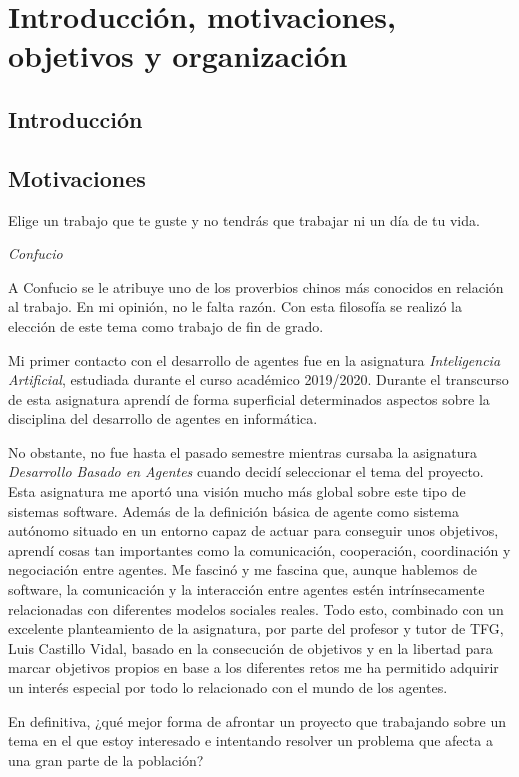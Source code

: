 \chapter{Introducción, motivaciones, objetivos y organización}
    \label{chap:one}

\section{Introducción}

\section{Motivaciones}
\epigraph{Elige un trabajo que te guste y no tendrás que trabajar ni un día de tu vida.}{\textit{Confucio}}

A Confucio se le atribuye uno de los proverbios chinos más conocidos en relación al trabajo. En mi opinión, no le falta razón. Con esta filosofía se realizó la elección de este tema como trabajo de fin de grado.

Mi primer contacto con el desarrollo de agentes fue en la asignatura \textit{Inteligencia Artificial}, estudiada durante el curso académico 2019/2020. Durante el transcurso de esta asignatura aprendí de forma superficial determinados aspectos sobre la disciplina del desarrollo de agentes en informática.

No obstante, no fue hasta el pasado semestre mientras cursaba la asignatura \textit{Desarrollo Basado en Agentes} cuando decidí seleccionar el tema del proyecto. Esta asignatura me aportó una visión mucho más global sobre este tipo de sistemas software. Además de la definición básica de agente como sistema autónomo situado en un entorno capaz de actuar para conseguir unos objetivos, aprendí cosas tan importantes como la comunicación, cooperación, coordinación y negociación entre agentes. Me fascinó y me fascina que, aunque hablemos de software, la comunicación y la interacción entre agentes estén intrínsecamente relacionadas con diferentes modelos sociales reales. Todo esto, combinado con un excelente planteamiento de la asignatura, por parte del profesor y tutor de TFG, Luis Castillo Vidal, basado en la consecución de objetivos y en la libertad para marcar objetivos propios en base a los diferentes retos me ha permitido adquirir un interés especial por todo lo relacionado con el mundo de los agentes.
    
En definitiva, ¿qué mejor forma de afrontar un proyecto que trabajando sobre un tema en el que estoy interesado e intentando resolver un problema que afecta a una gran parte de la población?

